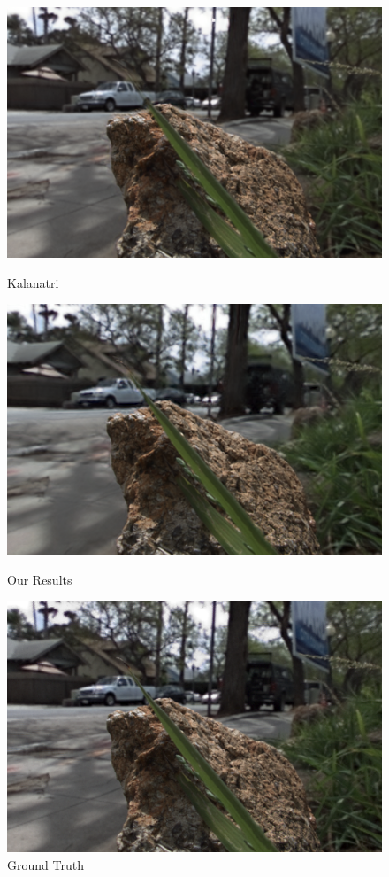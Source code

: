 \documentclass[10pt,twocolumn,letterpaper]{article}
\begin{document}
\begin{figure}[p]
\begin{multicols}{3}
    \end{multicols}
    \begin{multicols}{3}
        \includegraphics[width=\linewidth]{rock/kalantari_05_05.png}\par\caption*{Kalanatri \etal}
        \includegraphics[width=\linewidth]{rock/ours_05_05.png}\par\caption*{Our Results}
        \includegraphics[width=\linewidth]{rock/truth_05_05.png}\par\caption*{Ground Truth}

\end{multicols}
\end{figure}
\end{document}
